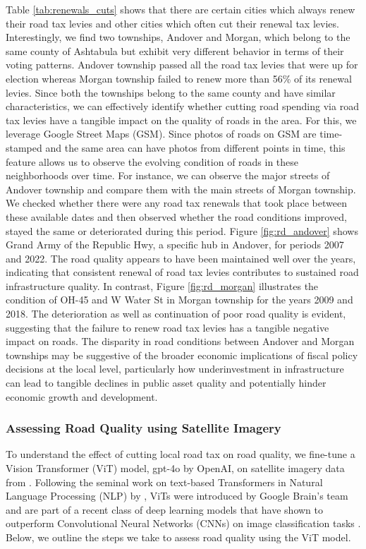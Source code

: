 Table \ref{tab:renewals_cuts} shows that there are certain cities which always renew their road tax levies and other cities which often cut their renewal tax levies. Interestingly, we find two townships, Andover and Morgan, which belong to the same county of Ashtabula but exhibit very different behavior in terms of their voting patterns. Andover township passed all the road tax levies that were up for election whereas Morgan township failed to renew more than 56\% of its renewal levies. Since both the townships belong to the same county and have similar characteristics, we can effectively identify whether cutting road spending via road tax levies have a tangible impact on the quality of roads in the area. For this, we leverage Google Street Maps (GSM). Since photos of roads on GSM are time-stamped and the same area can have photos from different points in time, this feature allows us to observe the evolving condition of roads in these neighborhoods over time. For instance, we can observe the major streets of Andover township and compare them with the main streets of Morgan township. We checked whether there were any road tax renewals that took place between these available dates and then observed whether the road conditions improved, stayed the same or deteriorated during this period. Figure \ref{fig:rd_andover} shows Grand Army of the Republic Hwy, a specific hub in Andover, for periods 2007 and 2022. The road quality appears to have been maintained well over the years, indicating that consistent renewal of road tax levies contributes to sustained road infrastructure quality. In contrast, Figure \ref{fig:rd_morgan} illustrates the condition of OH-45 and W Water St in Morgan township for the years 2009 and 2018. The deterioration as well as continuation of poor road quality is evident, suggesting that the failure to renew road tax levies has a tangible negative impact on roads. The disparity in road conditions between Andover and Morgan townships may be suggestive of the broader economic implications of fiscal policy decisions at the local level, particularly how underinvestment in infrastructure can lead to tangible declines in public asset quality and potentially hinder economic growth and development.

\subsubsection{Assessing Road Quality using Satellite Imagery} \label{sec:road_quality}

To understand the effect of cutting local road tax on road quality, we fine-tune a Vision Transformer (ViT) model, gpt-4o by OpenAI, on satellite imagery data from \cite{brewer2021}. Following the seminal work on text-based Transformers in Natural Language Processing (NLP) by \cite{vaswani2017attention}, ViTs were introduced by Google Brain's team and are part of a recent class of deep learning models that have shown to outperform Convolutional Neural Networks (CNNs) on image classification tasks \citep{dosovitskiy2020image}. Below, we outline the steps we take to assess road quality using the ViT model.


